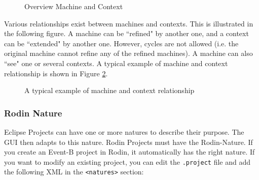 \begin{figure}[!ht]
\begin{center}
  \hspace*{5em}
	\caption{Overview Machine and Context}
	\label{fig_ref_10_project1}
\end{center}
\end{figure}


Various relationships exist between machines and contexts. This is illustrated in the following figure. A machine can be ``refined" by another one, and a context can be ``extended" by another one. However, cycles are not allowed (i.e. the original machine cannot refine any of the refined machines). A machine can also ``see" one or several contexts. A typical example of machine and context relationship is shown in Figure \ref{fig_ref_10_project2}. 

\begin{figure}[ht]
\begin{center}
	\caption{A typical example of machine and context relationship}
	\label{fig_ref_10_project2}
\end{center}
\end{figure}

\subsubsection{Rodin Nature}
\label{rodin_nature}

Eclipse Projects can have one or more natures to describe their purpose.  The GUI then adapts to this nature.  Rodin Projects must have the Rodin-Nature.  If you create an Event-B project in Rodin, it automatically has the right nature.  If you want to modify an existing project, you can edit the \texttt{.project} file and add the following XML in the \texttt{<natures>} section:

